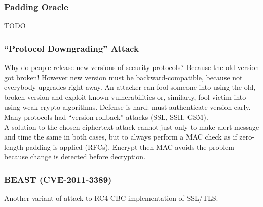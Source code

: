 \documentclass[a4paper, 10pt, titlepage]{article}
\begin{document}
\subsubsection*{Padding Oracle}
TODO

\subsubsection*{“Protocol Downgrading” Attack}
Why do people release new versions of security protocols? Because the old version got broken! However new version must be backward-compatible, because not everybody upgrades right away. An attacker can fool someone into using the old, broken version and exploit known vulnerabilities or, similarly, fool victim into using weak crypto algorithms. Defense is hard: must authenticate version early. Many protocols had “version rollback” attacks (SSL, SSH, GSM).\medskip\\
A solution to the chosen ciphertext attack cannot just only to make alert message and time the same in both cases, but to always perform a MAC check as if zero-length padding is applied (RFCs). Encrypt-then-MAC avoids the problem because change is detected before decryption.

\subsubsection{BEAST (CVE-2011-3389)}
Another variant of attack to RC4 CBC implementation of SSL/TLS.
\end{document}
